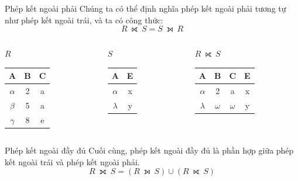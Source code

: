 \documentclass[11pt]{beamer}
\begin{document}
  \begin{frame}{Phép kết ngoài phải}
    Chúng ta có thể định nghĩa phép kết ngoài phải tương tự như phép kết ngoài trái, 
    và ta có công thức:
    $$R~⟖~S = S~⟕~R$$
  \end{frame}
  \begin{frame}
    \begin{columns}[T]
      \begin{column}{0.3\textwidth}
        \centering $R$
        \medskip \\
        \begin{tabular}{|c|c|c|}
          \hline
          \textbf{A} & \textbf{B} & \textbf{C}  \\[0.5ex] \hline\hline
          $\alpha$ & 2 & a\\ \hline
          $\beta$ & 5 & a\\ \hline
          $\gamma$ & 8 & e\\ \hline
        \end{tabular}
      \end{column}
      \begin{column}{0.3\textwidth}
        \centering $S$
        \medskip \\
        \begin{tabular}{|c|c|}
          \hline
          \textbf{A} & \textbf{E} \\[0.5ex] \hline\hline
          $\alpha$ & x\\ \hline
          $\lambda$ & y\\ \hline
        \end{tabular}
      \end{column}
      \begin{column}{0.3\textwidth}
        \centering $R~⟖~S$
        \medskip \\
        \begin{tabular}{|c|c|c|c|}
          \hline
          \textbf{A} & \textbf{B} & \textbf{C} & \textbf{E}\\[0.5ex] \hline\hline
          $\alpha$ & 2 & a & x\\ \hline
          $\lambda$ & \cellcolor{blue!25}$\omega$ & \cellcolor{blue!25}$\omega$ & y \\ \hline
        \end{tabular}
      \end{column}
    \end{columns}
  \end{frame}
  \begin{frame}{Phép kết ngoài đầy đủ}
    Cuối cùng, phép kết ngoài đầy đủ là phần hợp giữa phép kết ngoài trái và phép kết ngoài phải.
    $$
    R~⟗~S = (R~⟕~S) \cup (R~⟖~S)
    $$
  \end{frame}
\end{document}
